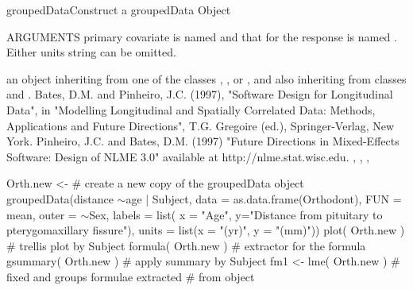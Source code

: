 \documentclass[pdftex]{article} \usepackage{url,graphicx}
\renewcommand{\Twiddle}{\mbox{\(\sim\)}}
\begin{document}
\begin{Helpfile}{groupedData}{Construct a groupedData Object}
\begin{Argument}{ARGUMENTS}
primary covariate is named  and that for the response is
named .  Either units string can be omitted.
\end{Argument}
an object inheriting from one of the classes ,
, or , and also inheriting
from  classes  and .
Bates, D.M. and Pinheiro, J.C. (1997), "Software Design for Longitudinal
Data", in "Modelling Longitudinal and Spatially Correlated Data:
Methods, Applications and Future Directions", T.G. Gregoire (ed.),
Springer-Verlag, New York.
Pinheiro, J.C. and Bates, D.M. (1997) "Future Directions in
Mixed-Effects Software: Design of NLME 3.0" available at
http://nlme.stat.wisc.edu.
, ,
, 
\need 15pt
\vspace{-16pt} 
\begin{Example}
Orth.new <-  # create a new copy of the groupedData object
  groupedData(distance \Twiddle age | Subject,
     data = as.data.frame(Orthodont),
     FUN = mean, outer = \Twiddle Sex,
     labels = list( x = "Age",
     y="Distance from pituitary to pterygomaxillary fissure"),
     units = list(x = "(yr)", y = "(mm)"))
plot( Orth.new )         # trellis plot by Subject
formula( Orth.new )      # extractor for the formula
gsummary( Orth.new )     # apply summary by Subject
fm1 <- lme( Orth.new )   # fixed and groups formulae extracted 
                         # from object
\end{Example}
\end{Helpfile}
\end{document}
